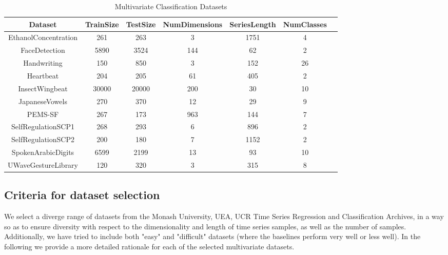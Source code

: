 \documentclass{article} \usepackage{iclr2021_conference,times}
\begin{document}
\begin{table}[h]
\begin{tabular}{@{}|c|c|c|c|c|c|c|@{}}
\hline
Dataset                 & TrainSize & TestSize & NumDimensions & SeriesLength & NumClasses  \\ \hline
EthanolConcentration    & 261       & 263      & 3             & 1751         & 4                   \\ 
FaceDetection   & 5890      & 3524     & 144           & 62           & 2                   \\ 
Handwriting             & 150       & 850      & 3             & 152          & 26                  \\ 
Heartbeat               & 204       & 205      & 61            & 405          & 2                   \\ 
InsectWingbeat  & 30000     & 20000    & 200           & 30           & 10                 \\ 
JapaneseVowels          & 270       & 370      & 12            & 29           & 9                   \\ 
PEMS-SF                 & 267       & 173      & 963           & 144          & 7                   \\ 
SelfRegulationSCP1      & 268       & 293      & 6             & 896          & 2                   \\ 
SelfRegulationSCP2      & 200       & 180      & 7             & 1152         & 2                   \\ 
SpokenArabicDigits      & 6599      & 2199     & 13            & 93           & 10                  \\ 
UWaveGestureLibrary     & 120       & 320      & 3             & 315          & 8                   \\ \hline
\end{tabular}
\caption{Multivariate Classification Datasets}
\label{tab:characteristics_classification_datasets}
\end{table}

\subsection{Criteria for dataset selection}

We select a diverge range of datasets from the Monash University, UEA, UCR Time Series Regression and Classification Archives, in a way so as to ensure diversity with respect to the dimensionality and length of time series samples, as well as the number of samples. Additionally, we have tried to include both "easy" and "difficult" datasets (where the baselines perform very well or less well). In the following we provide a more detailed rationale for each of the selected multivariate datasets.
\end{document}
